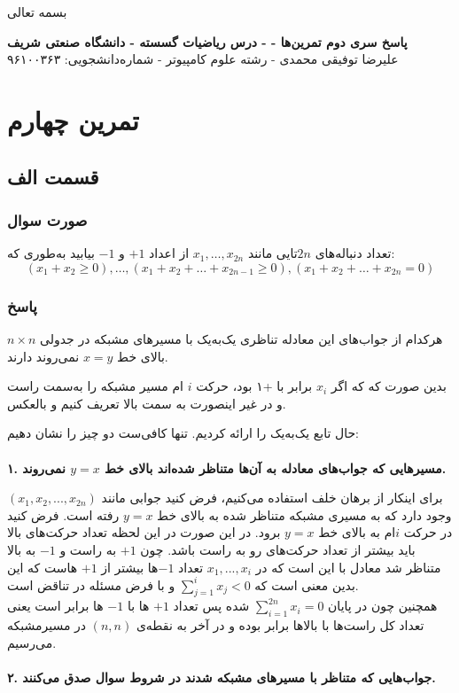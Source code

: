\documentclass[12pt,a4paper]{article}
\begin{document}
\begin{center}
	بسمه تعالی
\end{center}
\begin{center}
	\textbf{
		پاسخ سری دوم تمرین‌ها
		-
		- درس ریاضیات گسسته - دانشگاه صنعتی شریف}
	\\
	علیرضا توفیقی محمدی - رشته علوم کامپیوتر - شماره‌دانشجویی: ۹۶۱۰۰۳۶۳
\end{center}
\section{تمرین چهارم}
\subsection{قسمت الف}
\subsubsection{صورت سوال}
تعداد دنباله‌های $2n$تایی مانند 
$x_1, \dots, x_{2n}$
 از اعداد $+1$ و $-1$  بیابید به‌طوری که:
\[
(x_1 + x_2 \geq 0), \dots, 
(x_1 + x_2 + \dots + x_{2n-1} \geq 0), 
(x_1 + x_2 + \dots + x_{2n} = 0)
\]
\subsubsection{پاسخ}
هرکدام از جواب‌های این معادله تناظری یک‌به‌یک با مسیر‌های مشبکه در جدولی $n\times n$ بالای خط $x=y$ نمی‌روند دارند.

بدین صورت که که اگر $x_i$ برابر با +۱ بود، حرکت $i$ ام مسیر مشبکه را به‌سمت راست و در غیر اینصورت به سمت بالا تعریف کنیم و بالعکس.

حال تابع یک‌به‌یک را ارائه کردیم. تنها کافی‌ست دو چیز را نشان دهیم:\\
\\
\textbf{
۱. مسیر‌هایی که جواب‌های معادله به آن‌ها متناظر شده‌اند بالای خط $y=x$ نمی‌روند.
}

برای اینکار از برهان خلف استفاده می‌کنیم، فرض کنید جوابی مانند 
$(x_1, x_2, ..., x_{2n})$
وجود دارد که به مسیری مشبکه متناظر شده به بالای خط $y=x$ رفته است. فرض کنید در حرکت $i$ام به بالای خط $y=x$ برود. در این صورت در این لحظه تعداد حرکت‌های بالا باید بیشتر از تعداد حرکت‌های رو به راست باشد. چون $+1$ به راست و $-1$ به بالا متناظر شد معادل با این است که در $x_1, ..., x_i$ تعداد $-1$ها بیشتر از $+1$ هاست که این بدین معنی است که
$\sum_{j=1}^i x_j < 0$
و با فرض مسئله در تناقض است.
\\
همچنین چون در پایان $\sum_{i=1}^{2n} x_i = 0$ شده پس تعداد $+1$ ها با $-1$ ها برابر است یعنی تعداد کل راست‌ها با بالا‌ها برابر بوده و در آخر به نقطه‌ی $(n, n)$ در مسیرمشبکه می‌رسیم.
\\
\\
\textbf{
	۲. جواب‌هایی که متناظر با مسیر‌های مشبکه شدند در شروط
 سوال صدق می‌کنند.
}
\end{document}
